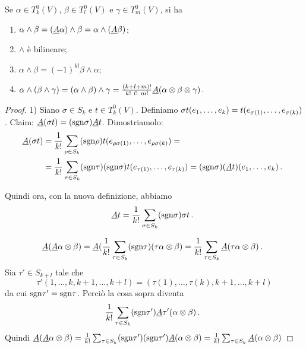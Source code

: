 \begin{proposition}
	Se $\alpha \in T^0_k(V)$, $\beta \in T^0_l(V)$ e $\gamma \in T^0_m(V)$, si ha
	\begin{enumerate}
		\item $\alpha\wedge\beta = (\antisimm \alpha) \wedge \beta = \alpha\wedge (\antisimm \beta)$;
		\item $\wedge$ è bilineare;
		\item $\alpha\wedge \beta = (-1)^{kl} \beta \wedge \alpha$;
		\item $\alpha\wedge(\beta\wedge \gamma) = (\alpha\wedge\beta)\wedge\gamma = \frac{(k+l+m)!}{k!\ l!\ m!}\antisimm(\alpha\otimes\beta\otimes\gamma)$.
	\end{enumerate}
\end{proposition}
\begin{proof}
	1)
	Siano $\sigma \in S_k$ e $t\in T^0_k(V)$. Definiamo $\sigma t(\seqb{e}{k}{,}) = t(e_{\sigma(1)}, \ldots, e_{\sigma(k)})$.
	Claim: $\antisimm (\sigma t) = (\sgn \sigma) \antisimm t$.
	Dimostriamolo:
	\begin{align*}
		\antisimm (\sigma t) &= \frac 1{k!} \sum_{\rho \in S_k} (\sgn \rho) t(e_{\rho\sigma (1)},\ldots,e_{\rho\sigma(k)}) =\\
		&= \frac 1{k!} \sum_{\tau\in S_k} (\sgn\tau)(\sgn\sigma) t(e_{\tau(1)}, \ldots, e_{\tau(k)}) = (\sgn\sigma) (\antisimm t)(\seqb{e}{k}{,})\punto
	\end{align*}
	
	Quindi ora, con la nuova definizione, abbiamo
	\begin{equation*}
		\antisimm t = \frac 1{k!} \sum_{\sigma\in S_k} (\sgn\sigma) \sigma t \punto
	\end{equation*}

	\begin{equation*}
		\antisimm(\antisimm \alpha \otimes \beta) = \antisimm(\frac 1{k!} \sum_{\tau\in S_k} (\sgn\tau) (\tau\alpha \otimes \beta) =
		\frac 1{k!} \sum_{\tau\in S_k} \antisimm(\tau\alpha\otimes \beta)\punto
	\end{equation*}
	Sia $\tau'\in S_{k+l}$ tale che
	\begin{equation*}
		\tau'(1,\ldots,k,k+1,\ldots,k+l) = (\tau(1),\ldots,\tau(k),k+1,\ldots,k+l)
	\end{equation*}
	da cui $\sgn\tau'=\sgn\tau$.
	Perciò la cosa sopra diventa
	\begin{equation*}
		\frac 1{k!} \sum_{\tau\in S_k} (\sgn\tau')\antisimm\tau'(\alpha\otimes \beta)\punto
	\end{equation*}
	Quindi $\antisimm(\antisimm\alpha\otimes \beta) = \frac 1{k!} \sum_{\tau\in S_k} (\sgn\tau')(\sgn\tau')\antisimm(\alpha\otimes \beta)=\frac 1{k!} \sum_{\tau\in S_k} \antisimm(\alpha\otimes \beta)$


\end{proof}
